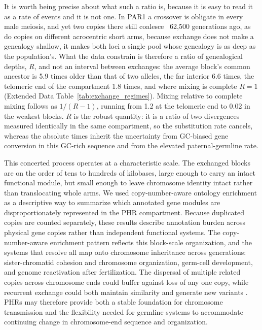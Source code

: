 \documentclass[pdflatex,mathphys]{jnl}
\begin{document}
It is worth being precise about what such a ratio is, because it is easy to read it as a rate of
events and it is not one. In PAR1 a crossover is obligate in every male meiosis, and yet two copies there
still coalesce ~62,500 generations ago, as do copies on different acrocentric short arms, because
exchange does not make a genealogy shallow, it makes both loci a single pool whose genealogy is as deep
as the population's. What the data constrain is therefore a ratio of genealogical
depths, $R$, and not an interval between exchanges: the average block's common ancestor is 5.9 times
older than that of two alleles, the far interior 6.6 times, the telomeric end of the compartment 1.8
times, and where mixing is complete $R = 1$ (Extended Data Table~\ref{tab:exchange_regimes}). Mixing relative to complete
mixing follows as $1/(R-1)$, running from 1.2 at the telomeric end to 0.02 in the weakest blocks. $R$ is
the robust quantity: it is a ratio of two divergences measured identically in the same compartment, so
the substitution rate cancels, whereas the absolute times inherit the uncertainty from GC-biased gene
conversion in this GC-rich sequence and from the elevated paternal-germline rate.

This concerted process operates at a characteristic scale. The exchanged blocks
are on the order of tens to hundreds of kilobases, large enough to carry an intact functional
module, but small
enough to leave chromosome identity intact rather than translocating whole
arms. We used copy-number-aware ontology enrichment as a descriptive way to
summarize which annotated gene modules are disproportionately represented in
the PHR compartment. Because duplicated copies are counted separately, these
results describe annotation burden across physical gene copies rather than
independent functional systems. The copy-number-aware enrichment pattern
reflects this block-scale organization, and the systems that resolve all map
onto chromosome inheritance across generations: sister-chromatid cohesion and
chromosome organization, germ-cell development, and genome reactivation after
fertilization. The dispersal of multiple related copies across chromosome ends
could buffer against loss of any one copy, while recurrent exchange could both
maintain similarity and generate new variants
\cite{Linardopoulou2005,Ambrosini2007}. PHRs may therefore provide both
a stable foundation for chromosome transmission and the flexibility needed for
germline systems to accommodate continuing change in chromosome-end sequence and
organization.
\end{document}
